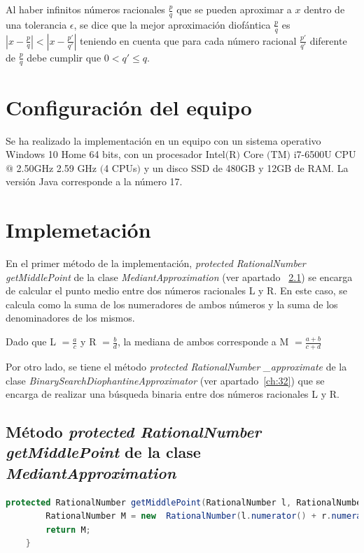 \documentclass[11pt,letterpaper]{article}
\begin{document}
Al haber infinitos números racionales $\frac{p}{q}$ que se pueden aproximar a $x$ dentro de una tolerancia $\epsilon$, se dice que la mejor aproximación diofántica $\frac{p}{q}$ es  $\left |  x - \frac{p}{q} \right | < \left |  x - \frac{p'}{q'} \right | $ teniendo en cuenta que para cada número racional $\frac{p'}{q'}$ diferente de $\frac{p}{q}$ debe cumplir que $0 < q' \leqslant q$.

\section{Configuración del equipo}
Se ha realizado la implementación en un equipo con un sistema operativo Windows 10 Home 64 bits, con un procesador Intel$($R$)$ Core $($TM$)$ i7-6500U CPU $@$ 2.50GHz 2.59 GHz $($4 CPUs$)$ y un disco SSD de 480GB y 12GB de RAM. La versión Java corresponde a la número 17.

\section{Implemetación}

En el primer método de la implementación, \textit{protected RationalNumber getMiddlePoint} de la clase \textit{MediantApproximation} (ver apartado ~\ref{ch:31}) se encarga de calcular el punto medio entre dos números racionales L y R. En este caso, se calcula como la suma de los numeradores de ambos números y la suma de los denominadores de los mismos. 

\begin{center}
	Dado que L $= \frac{a}{c}$ y R $= \frac{b}{d}$, la mediana de ambos corresponde a M $= \frac{a+b}{c+d}$
\end{center}

Por otro lado, se tiene el método \textit{protected RationalNumber \_approximate} de la clase \textit{BinarySearchDiophantineApproximator} (ver apartado~\ref{ch:32}) que se encarga de realizar una búsqueda binaria entre dos números racionales L y R. 


\subsection{Método \textit{protected RationalNumber getMiddlePoint} de la clase \textit{MediantApproximation}}\label{ch:31}

\begin{lstlisting}[language = java]
	protected RationalNumber getMiddlePoint(RationalNumber l, RationalNumber r) {
		RationalNumber M = new  RationalNumber(l.numerator() + r.numerator(), l.denominator() + r.denominator());
		return M;
	}
\end{lstlisting}
\end{document}
